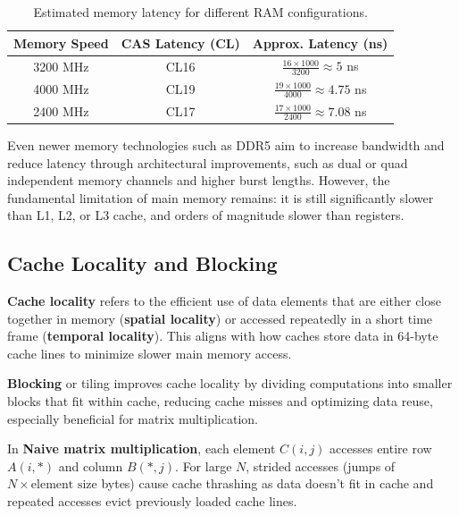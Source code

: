 \renewcommand{\arraystretch}{1.6}
\begin{table}[h!]
	\centering
	\begin{tabular}{|c|c|c|}
	\hline
	\textbf{Memory Speed} & \textbf{CAS Latency (CL)} & \textbf{Approx. Latency (ns)} \\ \hline
	3200 MHz             & CL16                      & $\frac{16 \times 1000}{3200} \approx 5$ ns \\ \hline
	4000 MHz             & CL19                      & $\frac{19 \times 1000}{4000} \approx 4.75$ ns \\ \hline
	2400 MHz             & CL17                      & $\frac{17 \times 1000}{2400} \approx 7.08$ ns \\ \hline
	\end{tabular}
	\caption{Estimated memory latency for different RAM configurations.}
\end{table}

Even newer memory technologies such as DDR5 aim to increase bandwidth and reduce latency through architectural improvements, such as dual or quad independent memory channels and higher burst lengths. However, the fundamental limitation of main memory remains: it is still significantly slower than L1, L2, or L3 cache, and orders of magnitude slower than registers.

\clearpage

\subsection{Cache Locality and Blocking}
\label{sec:cache_locality_and_blocking}

\textbf{Cache locality} refers to the efficient use of data elements that are either close together in memory (\textbf{spatial locality}) or accessed repeatedly in a short time frame (\textbf{temporal locality}). This aligns with how caches store data in 64-byte cache lines to minimize slower main memory access.

\textbf{Blocking} or tiling improves cache locality by dividing computations into smaller blocks that fit within cache, reducing cache misses and optimizing data reuse, especially beneficial for matrix multiplication. \cite{blocking}

In \textbf{Naive matrix multiplication}, each element $C(i,j)$ accesses entire row $A(i,*)$ and column $B(*,j)$. For large $N$, strided accesses (jumps of $N \times \text{element size}$ bytes) cause cache thrashing as data doesn't fit in cache and repeated accesses evict previously loaded cache lines.

